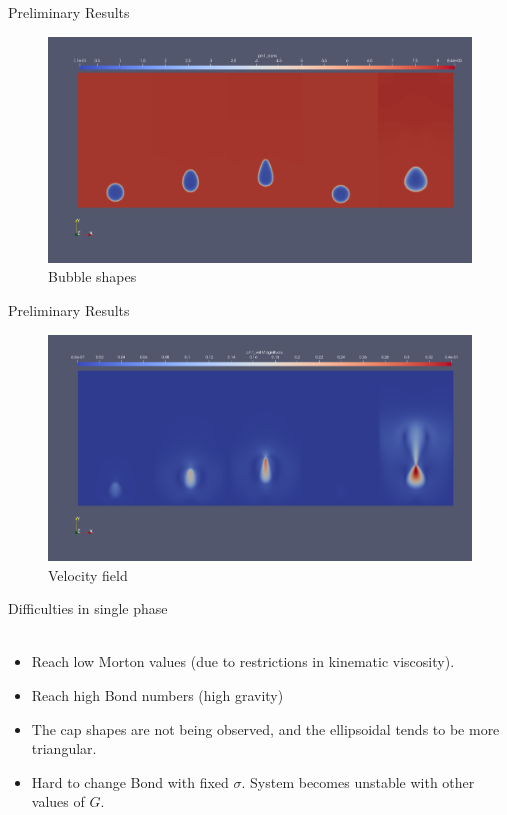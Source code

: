 \documentclass[8pt]{beamer}
\begin{document}
	\begin{frame}{Preliminary Results}
		\begin{figure}
			\centering
			\includegraphics[scale=0.2]{pics/risingCompDen.png}
			\\{\tiny \justifying Bubble shapes}
		\end{figure}
	\end{frame}

	\begin{frame}{Preliminary Results}
		\begin{figure}
			\centering
			\includegraphics[scale=0.2]{pics/risingCompVel.png}
			\\{\tiny \justifying Velocity field}
		\end{figure}
	\end{frame}

	\begin{frame}{Difficulties in single phase}
		\textbf{}\\~\\
		\begin{itemize}
			\item Reach low Morton values (due to restrictions in kinematic viscosity).
			\item Reach high Bond numbers (high gravity)
			\item The cap shapes are not being observed, and the ellipsoidal tends to be more triangular.
			\item Hard to change Bond with fixed $\sigma$. System becomes unstable with other values of $G$.
		\end{itemize}
	\end{frame}
		
\end{document}
